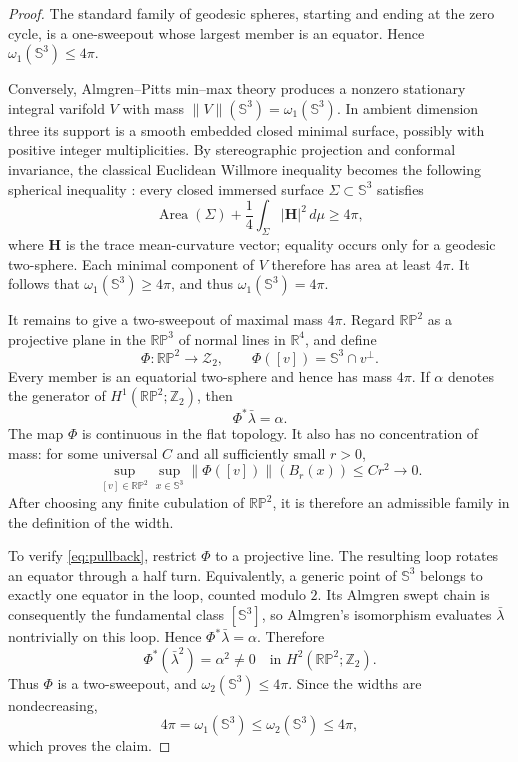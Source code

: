 \documentclass[11pt]{article}
\theoremstyle{remark}
\newcommand{\Sph}{\mathbb S}
\newcommand{\RP}{\mathbb {RP}}
\newcommand{\Ztwo}{\mathbb Z_2}
\newcommand{\Area}{\operatorname{Area}}
\begin{document}
\begin{proof}
The standard family of geodesic spheres, starting and ending at the zero
cycle, is a one-sweepout whose largest member is an equator.  Hence
$\omega_1(\Sph^3)\leq4\pi$.

Conversely, Almgren--Pitts min--max theory \cite{Pitts} produces a nonzero
stationary integral varifold $V$ with mass
$\|V\|(\Sph^3)=\omega_1(\Sph^3)$.  In ambient dimension three its support
is a smooth embedded closed minimal surface, possibly with positive
integer multiplicities.  By stereographic projection and conformal
invariance, the classical Euclidean Willmore inequality becomes the
following spherical inequality \cite{Willmore,MarquesNevesWillmore}: every
closed immersed surface $\Sigma\subset\Sph^3$ satisfies
\begin{equation}\label{eq:willmore}
  \Area(\Sigma)+\frac14\int_\Sigma |\mathbf H|^2\,d\mu\geq4\pi,
\end{equation}
where $\mathbf H$ is the trace mean-curvature vector; equality occurs only
for a geodesic two-sphere.  Each minimal component of $V$ therefore has
area at least $4\pi$.  It follows that $\omega_1(\Sph^3)\geq4\pi$, and
thus $\omega_1(\Sph^3)=4\pi$.

It remains to give a two-sweepout of maximal mass $4\pi$.  Regard
$\RP^2$ as a projective plane in the $\RP^3$ of normal lines in
$\mathbb R^4$, and define
\[
  \Phi:\RP^2\longrightarrow\mathcal Z_2,
  \qquad
  \Phi([v])=\Sph^3\cap v^\perp.
\]
Every member is an equatorial two-sphere and hence has mass $4\pi$.  If
$\alpha$ denotes the generator of $H^1(\RP^2;\Ztwo)$, then
\begin{equation}\label{eq:pullback}
  \Phi^*\bar\lambda=\alpha.
\end{equation}
The map $\Phi$ is continuous in the flat topology.  It also has no
concentration of mass: for some universal $C$ and all sufficiently small
$r>0$,
\[
  \sup_{[v]\in\RP^2}\sup_{x\in\Sph^3}
  \|\Phi([v])\|(B_r(x))\leq Cr^2\longrightarrow0.
\]
After choosing any finite cubulation of $\RP^2$, it is therefore an
admissible family in the definition of the width.

To verify \eqref{eq:pullback}, restrict $\Phi$ to a projective line.  The
resulting loop rotates an equator through a half turn.  Equivalently, a
generic point of $\Sph^3$ belongs to exactly one equator in the loop,
counted modulo $2$.  Its Almgren swept chain is consequently the
fundamental class $[\Sph^3]$, so Almgren's isomorphism evaluates
$\bar\lambda$ nontrivially on this loop.  Hence
$\Phi^*\bar\lambda=\alpha$.  Therefore
\[
  \Phi^*(\bar\lambda^2)=\alpha^2\neq0
  \quad\text{in }H^2(\RP^2;\Ztwo).
\]
Thus $\Phi$ is a two-sweepout, and
$\omega_2(\Sph^3)\leq4\pi$.  Since the widths are nondecreasing,
\[
  4\pi=\omega_1(\Sph^3)\leq\omega_2(\Sph^3)\leq4\pi,
\]
which proves the claim.
\end{proof}
\end{document}
